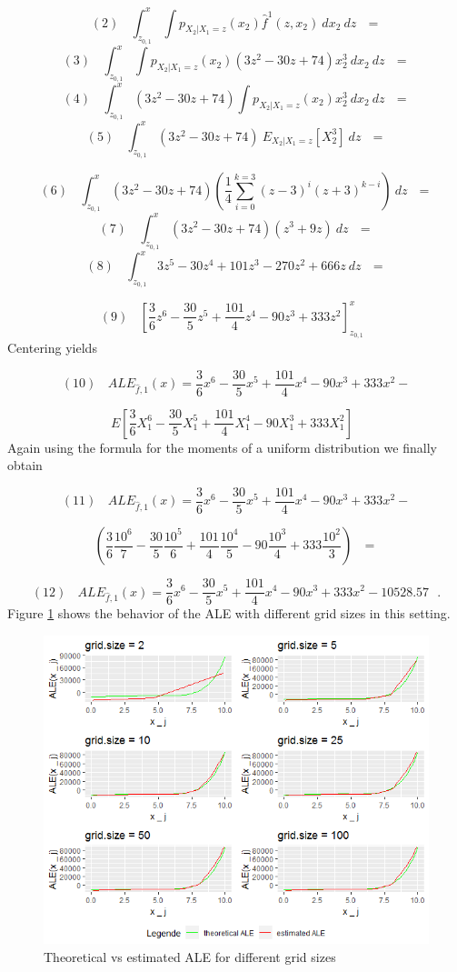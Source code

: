 \documentclass[
]{krantz}
\begin{document}
\[(2)~~~~ \int_{z_{0,1}}^x \int p_{X_2\vert X_1=z}(x_2)\hat{f}^1(z,x_2)~dx_2~dz~~~=\]
\[(3)~~~~ \int_{z_{0,1}}^x \int p_{X_2\vert X_1=z}(x_2)(3z^2 -30z +74)x_2^3~dx_2~dz~~~=\]
\[(4)~~~~ \int_{z_{0,1}}^x (3z^2 -30z +74)\int p_{X_2\vert X_1=z}(x_2)x_2^3~dx_2~dz~~~=\]
\[(5)~~~~ \int_{z_{0,1}}^x (3z^2 -30z +74)~E_{X_2\vert X_1 = z}[X_2^3]~dz~~~=\]

\[(6)~~~~ \int_{z_{0,1}}^x (3z^2 -30z +74)(\frac{1}{4}\sum_{i=0}^{k=3}(z-3)^i(z+3)^{k-i})~dz~~~=\]
\[(7)~~~~ \int_{z_{0,1}}^x (3z^2 -30z +74)(z^3 + 9z)~dz~~~=\]
\[(8)~~~~ \int_{z_{0,1}}^x 3 z^5 - 30 z^4 + 101 z^3 - 270 z^2 + 666 z ~dz~~~=\]

\[(9)~~~~ [ \frac{3}{6} z^6 - \frac{30}{5}z^5 + \frac{101}{4}z^4 - 90 z^3 + 333 z^2]_{z_{0,1}}^x~~~\]
Centering yields

\[(10)~~~~ALE_{\hat{f},1}(x) =  \frac{3}{6} x^6 - \frac{30}{5}x^5 + \frac{101}{4}x^4 - 90 x^3 + 333 x^2 - \]

\[E[ \frac{3}{6} X_1^6 - \frac{30}{5}X_1^5 + \frac{101}{4}X_1^4 - 90 X_1^3 + 333 X_1^2] ~~~\]
Again using the formula for the moments of a uniform distribution we finally obtain

\[(11)~~~~ALE_{\hat{f},1}(x) =  \frac{3}{6} x^6 - \frac{30}{5}x^5 + \frac{101}{4}x^4 - 90 x^3 + 333 x^2 - \]

\[(\frac{3}{6}\frac{10^6}{7}-\frac{30}{5}\frac{10^5}{6} +\frac{101}{4}\frac{10^4}{5}-90\frac{10^3}{4}+333\frac{10^2}{3}) ~~~=\]

\[(12)~~~~ALE_{\hat{f},1}(x) =  \frac{3}{6} x^6 - \frac{30}{5}x^5 + \frac{101}{4}x^4 - 90 x^3 + 333 x^2 - 10528.57~~~.\]
Figure \ref{fig:exampleALE2} shows the behavior of the ALE with different grid sizes in this setting.

\begin{figure}
\includegraphics[width=1\linewidth]{images/ALE_2_example2_6plots_} \caption{Theoretical vs estimated ALE for different grid sizes}\label{fig:exampleALE2}
\end{figure}
\end{document}
